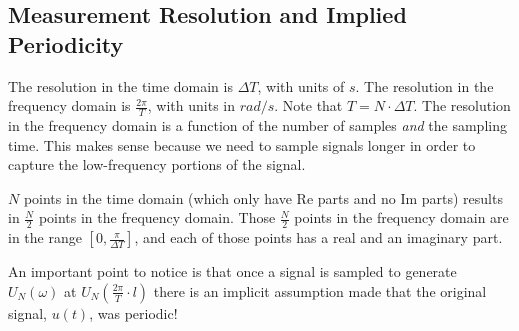 \documentclass[lecture,12pt,]{pcms-l}
\theoremstyle{example}
\newcommand{\w}{\omega}
\begin{document}
\subsection{Measurement Resolution and Implied Periodicity}
The resolution in the time domain is $\Delta T$, with units of $s$. The resolution in the frequency domain is $\frac{2\pi}{T}$, with units in $rad/s$. Note that $T=N\cdot\Delta T$. The resolution in the frequency domain is a function of the number of samples \textit{and} the sampling time. This makes sense because  we need to sample signals longer in order to capture the low-frequency portions of the signal.

$N$ points in the time domain (which only have $\text{Re}$ parts and no $\text{Im}$ parts) results in $\frac{N}{2}$ points in the frequency domain. Those $\frac{N}{2}$ points in the frequency domain are in the range $[0,\frac{\pi}{\Delta T}]$, and each of those points has a real and an imaginary part.

An important point to notice is that once a signal is sampled to generate $U_N(\w)$ at $U_N(\frac{2\pi}{T}\cdot l)$ there is an implicit assumption made that the original signal, $u(t)$, was periodic!
\end{document}
